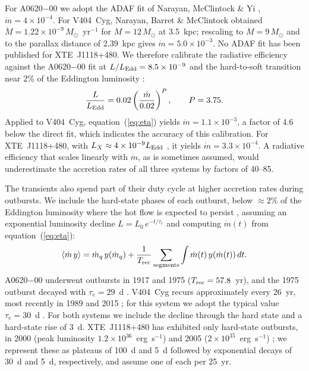 \documentclass[twocolumn,showpacs,preprintnumbers,amsmath,amssymb]{revtex4}
\begin{document}
For A0620$-$00 we adopt the ADAF fit of Narayan, McClintock \& Yi \cite{NMY1996}, $\dot m = 4\times10^{-4}$. For V404~Cyg, Narayan, Barret \& McClintock \cite{NBM1997} obtained $\dot M = 1.22\times10^{-9}\,M_\odot$~yr$^{-1}$ for $M=12\,M_\odot$ at 3.5~kpc; rescaling to $M = 9\,M_\odot$ \cite{Khargharia2010} and to the parallax distance of 2.39~kpc \cite{MillerJones2009} gives $\dot m = 5.0\times10^{-3}$. No ADAF fit has been published for XTE~J1118+480. We therefore calibrate the radiative efficiency against the A0620$-$00 fit at $L/L_{\rm Edd}=8.5\times10^{-9}$ \cite{Yang2016} and the hard-to-soft transition near 2\% of the Eddington luminosity \cite{Maccarone2003}:
\begin{equation}
\label{eq:eta}
\frac{L}{L_{\rm Edd}} = 0.02\left(\frac{\dot m}{0.02}\right)^{P}, \qquad P = 3.75 .
\end{equation}
Applied to V404~Cyg, equation~(\ref{eq:eta}) yields $\dot m = 1.1\times10^{-3}$, a factor of 4.6 below the direct fit, which indicates the accuracy of this calibration. For XTE~J1118+480, with $L_X\approx 4\times10^{-9}L_{\rm Edd}$ \cite{McClintock2003}, it yields $\dot m = 3.3\times10^{-4}$. A radiative efficiency that scales linearly with $\dot m$, as is sometimes assumed, would underestimate the accretion rates of all three systems by factors of 40--85.

The transients also spend part of their duty cycle at higher accretion rates during outbursts. We include the hard-state phases of each outburst, below $\approx2\%$ of the Eddington luminosity where the hot flow is expected to persist \cite{Maccarone2003}, assuming an exponential luminosity decline $L = L_0\,e^{-t/\tau_e}$ and computing $\dot m(t)$ from equation~(\ref{eq:eta}):
\begin{equation}
\label{eq:duty}
\langle \dot m\, y\rangle = \dot m_q\, y(\dot m_q) + \frac{1}{T_{\rm rec}}\sum_{\rm segments}\int \dot m(t)\, y(\dot m(t))\, dt .
\end{equation}
A0620$-$00 underwent outbursts in 1917 and 1975 ($T_{\rm rec}=57.8$~yr), and the 1975 outburst decayed with $\tau_e = 29$~d \cite{Kuulkers1998,Chen1997}. V404~Cyg recurs approximately every 26~yr, most recently in 1989 and 2015 \cite{Oates2019}; for this system we adopt the typical value $\tau_e = 30$~d \cite{Chen1997}. For both systems we include the decline through the hard state and a hard-state rise of 3~d. XTE~J1118+480 has exhibited only hard-state outbursts, in 2000 (peak luminosity $1.2\times10^{36}$~erg~s$^{-1}$) and 2005 ($2\times10^{35}$~erg~s$^{-1}$) \cite{Zurita2006}; we represent these as plateaus of 100~d and 5~d followed by exponential decays of 30~d and 5~d, respectively, and assume one of each per 25~yr.
\end{document}
